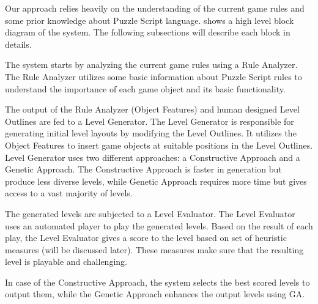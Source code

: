 Our approach relies heavily on the understanding of the current game rules and some prior knowledge about Puzzle Script language.  shows a high level block diagram of the system. The following subsections will describe each block in details.


The system starts by analyzing the current game rules using a Rule Analyzer. The Rule Analyzer utilizes some basic information about Puzzle Script rules to understand the importance of each game object and its basic functionality.\\\par

The output of the Rule Analyzer (Object Features) and human designed Level Outlines are fed to a Level Generator. The Level Generator is responsible for generating initial level layouts by modifying the Level Outlines. It utilizes the Object Features to insert game objects at suitable positions in the Level Outlines. Level Generator uses two different approaches: a Constructive Approach and a Genetic Approach. The Constructive Approach is faster in generation but produce less diverse levels, while Genetic Approach requires more time but gives access to a vast majority of levels.\\\par

The generated levels are subjected to a Level Evaluator. The Level Evaluator uses an automated player to play the generated levels. Based on the result of each play, the Level Evaluator gives a score to the level based on set of heuristic measures (will be discussed later). These measures make sure that the resulting level is playable and challenging.\\\par

In case of the Constructive Approach, the system selects the best scored levels to output them, while the Genetic Approach enhances the output levels using GA.

